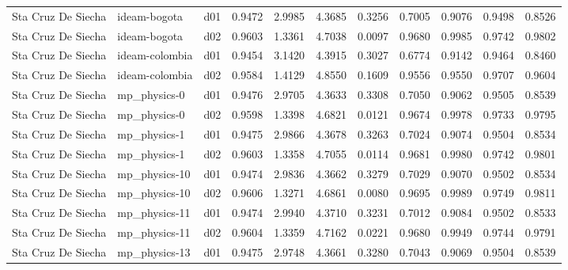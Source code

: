 \begin{longtable}{lllrrrrrrrr}
   Sta Cruz De Siecha  &          ideam-bogota &     d01 &   0.9472 &   2.9985 &   4.3685 &       0.3256 &        0.7005 &       0.9076 &           0.9498 &  0.8526 \\
   Sta Cruz De Siecha  &          ideam-bogota &     d02 &   0.9603 &   1.3361 &   4.7038 &       0.0097 &        0.9680 &       0.9985 &           0.9742 &  0.9802 \\
   Sta Cruz De Siecha  &        ideam-colombia &     d01 &   0.9454 &   3.1420 &   4.3915 &       0.3027 &        0.6774 &       0.9142 &           0.9464 &  0.8460 \\
   Sta Cruz De Siecha  &        ideam-colombia &     d02 &   0.9584 &   1.4129 &   4.8550 &       0.1609 &        0.9556 &       0.9550 &           0.9707 &  0.9604 \\
   Sta Cruz De Siecha  &          mp\_physics-0 &     d01 &   0.9476 &   2.9705 &   4.3633 &       0.3308 &        0.7050 &       0.9062 &           0.9505 &  0.8539 \\
   Sta Cruz De Siecha  &          mp\_physics-0 &     d02 &   0.9598 &   1.3398 &   4.6821 &       0.0121 &        0.9674 &       0.9978 &           0.9733 &  0.9795 \\
   Sta Cruz De Siecha  &          mp\_physics-1 &     d01 &   0.9475 &   2.9866 &   4.3678 &       0.3263 &        0.7024 &       0.9074 &           0.9504 &  0.8534 \\
   Sta Cruz De Siecha  &          mp\_physics-1 &     d02 &   0.9603 &   1.3358 &   4.7055 &       0.0114 &        0.9681 &       0.9980 &           0.9742 &  0.9801 \\
   Sta Cruz De Siecha  &         mp\_physics-10 &     d01 &   0.9474 &   2.9836 &   4.3662 &       0.3279 &        0.7029 &       0.9070 &           0.9502 &  0.8534 \\
   Sta Cruz De Siecha  &         mp\_physics-10 &     d02 &   0.9606 &   1.3271 &   4.6861 &       0.0080 &        0.9695 &       0.9989 &           0.9749 &  0.9811 \\
   Sta Cruz De Siecha  &         mp\_physics-11 &     d01 &   0.9474 &   2.9940 &   4.3710 &       0.3231 &        0.7012 &       0.9084 &           0.9502 &  0.8533 \\
   Sta Cruz De Siecha  &         mp\_physics-11 &     d02 &   0.9604 &   1.3359 &   4.7162 &       0.0221 &        0.9680 &       0.9949 &           0.9744 &  0.9791 \\
   Sta Cruz De Siecha  &         mp\_physics-13 &     d01 &   0.9475 &   2.9748 &   4.3661 &       0.3280 &        0.7043 &       0.9069 &           0.9504 &  0.8539 \\

\end{longtable}
